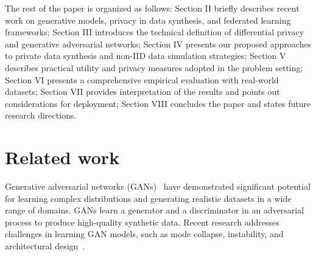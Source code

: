 \documentclass[conference]{IEEEtran}
\begin{document}
The rest of the paper is organized as follows: Section II briefly describes recent work on generative models, privacy in data synthesis, and federated learning frameworks; Section III introduces the technical definition of differential privacy and generative adversarial networks; Section IV presents our proposed approaches to private data synthesis and non-IID data simulation strategies; Section V describes practical utility and privacy measures adopted in the problem setting; Section VI presents a comprehensive empirical evaluation with real-world datasets; Section VII provides interpretation of the results and points out considerations for deployment; Section VIII concludes the paper and states future research directions.




\section{Related work}



Generative adversarial networks (GANs)~\cite{GANGoodFellow2014} have demonstrated significant potential for learning complex distributions and generating realistic datasets in a wide range of domains. %
GANs learn a generator and a discriminator in an adversarial process to produce high-quality synthetic data.  Recent research addresses challenges in learning GAN models, such as mode collapse, instability, and architectural design~\cite{SaxenaSurveyGANs2020}. %
\end{document}
